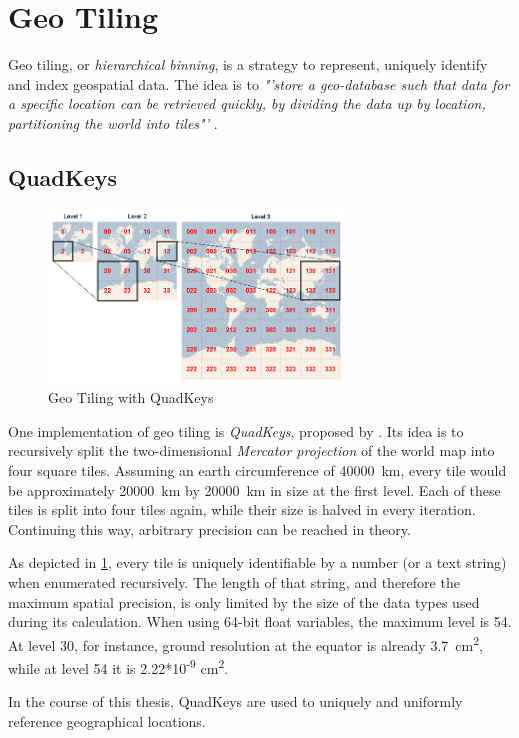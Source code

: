 \section{Geo Tiling}
\label{sec:background:geo_tiling}
Geo tiling, or \textit{hierarchical binning}, is a strategy to represent, uniquely identify and index geospatial data. The idea is to \textit{"'store a geo-database such that data for a specific location can be retrieved quickly, by dividing the data up by location, partitioning the world into tiles"'} \cite{wiki:quadtiles}. 

\subsection{QuadKeys}
\label{subsec:background:quadkeys}

\begin{figure}[H]
	\centering
	\includegraphics[width=0.7\textwidth]{98_images/quadkeys.jpg}
	\caption[Geo Tiling with QuadKeys]{Geo Tiling with QuadKeys \cite{wiki:quadtiles}}
	\label{fig:quadkeys}
\end{figure}


One implementation of geo tiling is \textit{QuadKeys}, proposed by \cite{Schwartz2018}. Its idea is to recursively split the two-dimensional \textit{Mercator projection} of the world map into four square tiles. Assuming an earth circumference of \SI{40000}{\kilo\meter}, every tile would be approximately \SI{20000}{\kilo\meter} by \SI{20000}{\kilo\meter} in size at the first level. Each of these tiles is split into four tiles again, while their size is halved in every iteration. Continuing this way, arbitrary precision can be reached in theory.

As depicted in \cref{fig:quadkeys}, every tile is uniquely identifiable by a number (or a text string) when enumerated recursively. The length of that string, and therefore the maximum spatial precision, is only limited by the size of the data types used during its calculation. When using 64-bit float variables, the maximum level is 54. At level 30, for instance, ground resolution at the equator is already \SI{3.7}{\square\centi\meter}, while at level 54 it is 2.22*10\textsuperscript{-9} \si{\square\centi\meter}.
\par
\bigskip

In the course of this thesis, QuadKeys are used to uniquely and uniformly reference geographical locations. 